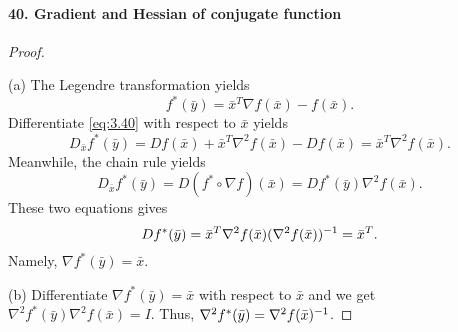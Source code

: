   \paragraph{40. Gradient and Hessian of conjugate function}
  \begin{proof}
    $\,$\par
    (a) The Legendre transformation yields
    \begin{equation}
      \label{eq:3.40}
      f^*(\bar{y})=\bar{x}^T\nabla f(\bar{x})-f(\bar{x}).
    \end{equation}
    Differentiate \eqref{eq:3.40} with respect to $\bar{x}$ yields
    \[
      D_{\bar{x}}f^*(\bar{y})=
      Df(\bar{x})+\bar{x}^T\nabla^2f(\bar{x})-Df(\bar{x})=
      \bar{x}^T\nabla^2f(\bar{x}).
    \]
    Meanwhile, the chain rule yields
    \[
      D_{\bar{x}}f^*(\bar{y})=
      D(f^*\circ\nabla f)(\bar{x})=
      Df^*(\bar{y})\nabla^2f(\bar{x}).
    \]
    These two equations gives
    \[
      Df^*(\bar{y})=\bar{x}^T\nabla^2f(\bar{x})(\nabla^2f(\bar{x}))^{-1}=
      \bar{x}^T.
    \]
    Namely, $\nabla f^*(\bar{y})=\bar{x}$.\par
    (b) Differentiate $\nabla f^*(\bar{y})=\bar{x}$ with respect to $\bar{x}$
    and we get $\nabla^2f^*(\bar{y})\nabla^2f(\bar{x})=I$. Thus, $\nabla^2f^*
    (\bar{y})=\nabla^2f(\bar{x})^{-1}$.
  \end{proof}



















